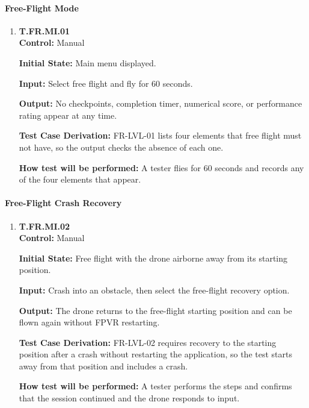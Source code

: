 \documentclass[12pt, titlepage]{article}
\begin{document}
{\sloppy
\paragraph{Free-Flight Mode}

\begin{enumerate}

\item{\hypertarget{test-fr-mi-01}{}\textbf{T.FR.MI.01}\\}
\textbf{Control:} Manual

\textbf{Initial State:} Main menu displayed.

\textbf{Input:} Select free flight and fly for 60 seconds.

\textbf{Output:} No checkpoints, completion timer, numerical score, or performance
rating appear at any time.

\textbf{Test Case Derivation:} \mbox{FR-LVL-01} lists four elements that free flight
must not have, so the output checks the absence of each one.

\textbf{How test will be performed:} A tester flies for 60 seconds and records any of
the four elements that appear.

\end{enumerate}

\paragraph{Free-Flight Crash Recovery}

\begin{enumerate}

\item{\hypertarget{test-fr-mi-02}{}\textbf{T.FR.MI.02}\\}
\textbf{Control:} Manual

\textbf{Initial State:} Free flight with the drone airborne away from its starting
position.

\textbf{Input:} Crash into an obstacle, then select the free-flight recovery option.

\textbf{Output:} The drone returns to the free-flight starting position and can be flown
again without FPVR restarting.

\textbf{Test Case Derivation:} \mbox{FR-LVL-02} requires recovery to the starting
position after a crash without restarting the application, so the test starts away from
that position and includes a crash.

\textbf{How test will be performed:} A tester performs the steps and confirms that the
session continued and the drone responds to input.


\end{enumerate}}
\end{document}
